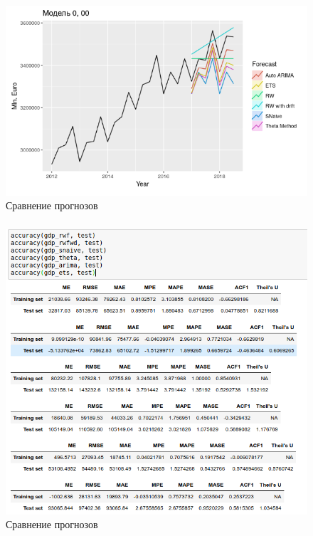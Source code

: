 \documentclass[c, dvipsnames]{beamer}  %
\begin{document}
\begin{frame}[shrink=5]
\frametitle{\insertsection} 
\framesubtitle{\insertsubsection}



\begin{figure}
	\centering
	\includegraphics[width=0.7\linewidth]{screenshot022}
	\caption{Сравнение прогнозов}
	\label{fig:screenshot021}
\end{figure}





\end{frame}





\begin{frame}[shrink=5]
\frametitle{\insertsection} 
\framesubtitle{\insertsubsection}



\begin{figure}
	\centering
	\includegraphics[width=0.7\linewidth]{screenshot023}
	\caption{Сравнение прогнозов}
	\label{fig:screenshot021}
\end{figure}





\end{frame}
\end{document}
